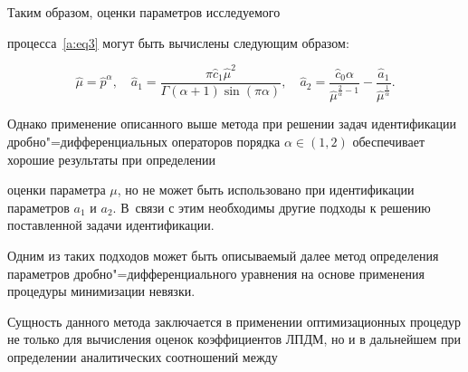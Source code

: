 



Таким образом, оценки параметров исследуемого

процесса~\eqref{a:eq3} могут быть вычислены следующим образом:

\begin{equation}

\label{f2_2_14}

\hat{\mu}=\hat{p}^{\alpha},\quad

\hat{a}_1=\dfrac{\pi \hat{c}_1  \hat{\mu}^2 }{\Gamma(\alpha+1) \sin(\pi \alpha)},\quad

\hat{a}_2=\dfrac{\hat{c}_0 \alpha }{\hat{\mu}^{\frac{2}{\alpha}-1}}-\dfrac{\hat{a}_1}{\hat{\mu}^{\frac{1}{\alpha}}}.

\end{equation}



\smallskip




Однако применение описанного выше метода при решении задач идентификации дробно"=дифференциальных операторов порядка $\alpha\in (1, 2)$ обеспечивает хорошие результаты при определении

оценки параметра $\mu$, но не может быть использовано при идентификации параметров $a_1$ и $a_2$. В~связи с этим необходимы другие подходы к решению поставленной задачи идентификации.



Одним из таких подходов может быть описываемый далее метод определения параметров дробно"=дифференциального уравнения на основе применения процедуры минимизации невязки.


Сущность данного метода заключается в применении оптимизационных процедур не только для вычисления оценок коэффициентов ЛПДМ, но и в дальнейшем при определении аналитических соотношений между

